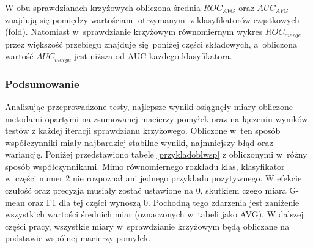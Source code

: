 \par
W obu sprawdzianach krzyżowych obliczona średnia $ROC_{AVG}$ oraz $AUC_{AVG}$ znajdują się pomiędzy wartościami otrzymanymi z klasyfikatorów cząstkowych (fold). Natomiast w~sprawdzianie krzyżowym równomiernym wykres $ROC_{merge}$ przez większość przebiegu znajduje się poniżej części składowych, a~obliczona wartość $AUC_{merge}$ jest niższa od AUC każdego klasyfikatora.


\subsubsection{Podsumowanie}
Analizując przeprowadzone testy, najlepsze wyniki osiągnęły miary obliczone metodami opartymi na zsumowanej macierzy pomyłek oraz na łączeniu wyników testów z każdej iteracji sprawdzianu krzyżowego. Obliczone w~ten sposób współczynniki miały najbardziej stabilne wyniki, najmniejszy błąd oraz wariancję. Poniżej przedstawiono tabelę \ref{przykladoblwsp} z obliczonymi w~różny sposób współczynnikami. Mimo równomiernego rozkładu klas, klasyfikator w~części numer 2 nie rozpoznał ani jednego przykładu pozytywnego. W efekcie czułość oraz precyzja musiały zostać ustawione na 0, skutkiem czego miara G-mean oraz F1 dla tej części wynoszą 0. Pochodną tego zdarzenia jest zaniżenie wszystkich wartości średnich miar (oznaczonych w~tabeli jako AVG). W dalszej części pracy, wszystkie miary w~sprawdzianie krzyżowym będą obliczane na podstawie wspólnej macierzy pomyłek. 
